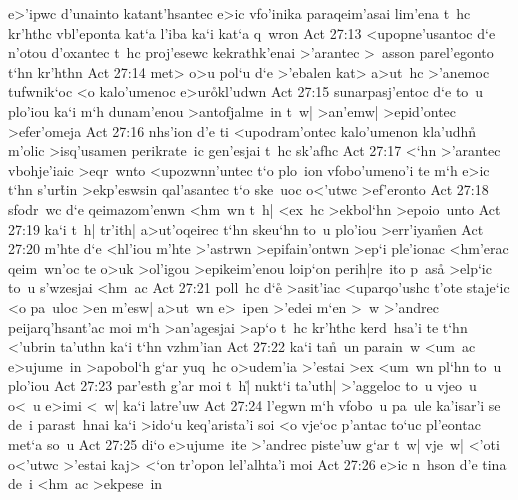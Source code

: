 e>'ipwc
d'unainto
katant'hsantec
e>ic
vfo'inika
paraqeim'asai
lim'ena
t~hc
kr'hthc
vbl'eponta
kat`a
l'iba
ka`i
kat`a
q~wron\bibvsend
\vs Act 27:13
<upopne'usantoc
d`e
n'otou
d'oxantec
t~hc
proj'esewc
kekrathk'enai
>'arantec
>~asson
parel'egonto
t`hn
kr'hthn\bibvsend
\vs Act 27:14
met>
o>u
pol`u
d`e
>'ebalen
kat>
a>ut~hc
>'anemoc
tufwnik`oc
<o
kalo'umenoc
e>ur\r{o}kl'udwn\bibvsend
{}
\vs Act 27:15
sunarpasj'entoc
d`e
to~u
plo'iou
ka`i
m`h
dunam'enou
>antofjalme~in
t~w|
>an'emw|
>epid'ontec
>efer'omeja\bibvsend
\vs Act 27:16
nhs'ion
d'e
ti
<upodram'ontec
kalo'umenon
kla'udhn\r{}
m'olic
>isq'usamen
perikrate~ic
gen'esjai
t~hc
sk'afhc\bibvsend
\vs Act 27:17
<`hn
>'arantec
vbohje'iaic
>eqr~wnto
<upozwnn'untec
t`o
plo~ion
vfobo'umeno'i
te
m`h
e>ic
t`hn
s'ur\r{t}in
>ekp'eswsin
qal'asantec
t`o
ske~uoc
o<'utwc
>ef'eronto\bibvsend
\vs Act 27:18
sfodr~wc
d`e
qeimazom'enwn
<hm~wn
t~h|
<ex~hc
>ekbol`hn
>epoio~unto\bibvsend
\vs Act 27:19
ka`i
t~h|
tr'ith|
a>ut'oqeirec
t`hn
skeu`hn
to~u
plo'iou
>err'iya\r{m}en\bibvsend
{}
\vs Act 27:20
m'hte
d`e
<hl'iou
m'hte
>'astrwn
>epifain'ontwn
>ep`i
ple'ionac
<hm'erac
qeim~wn'oc
te
o>uk
>ol'igou
>epikeim'enou
loip`on
perih|re~ito
p~asa\r{}
>elp`ic
to~u
s'wzesjai
<hm~ac\bibvsend
\vs Act 27:21
poll~hc
d`e\r{}
>asit'iac
<uparqo'ushc
t'ote
staje`ic
<o
pa~uloc
>en
m'esw|
a>ut~wn
e>~ipen
>'edei
m`en
>~w
>'andrec
peijarq'hsant'ac
moi
m`h
>an'agesjai
>ap`o
t~hc
kr'hthc
kerd~hsa'i
te
t`hn
<'ubrin
ta'uthn
ka`i
t`hn
vzhm'ian\bibvsend
\vs Act 27:22
ka`i
ta\r{n}~un
parain~w
<um~ac
e>ujume~in
>apobol`h
g`ar
yuq~hc
o>udem'ia
>'estai
>ex
<um~wn
pl`hn
to~u
plo'iou\bibvsend
\vs Act 27:23
par'esth
g'ar
moi
t~h|\r{}
nukt`i
ta'uth|
>'aggeloc
to~u
vjeo~u
o<~u
e>imi
<~w|
ka`i
latre'uw\bibvsend
\vs Act 27:24
l'egwn
m`h
vfobo~u
pa~ule
ka'isar'i
se
de~i
parast~hnai
ka`i
>ido`u
keq'arista'i
soi
<o
vje`oc
p'antac
to`uc
pl'eontac
met`a
so~u\bibvsend
\vs Act 27:25
di`o
e>ujume~ite
>'andrec
piste'uw
g`ar
t~w|
vje~w|
<'oti
o<'utwc
>'estai
kaj>
<`on
tr'opon
lel'alhta'i
moi\bibvsend
\vs Act 27:26
e>ic
n~hson
d'e
tina
de~i
<hm~ac
>ekpese~in\bibvsend
